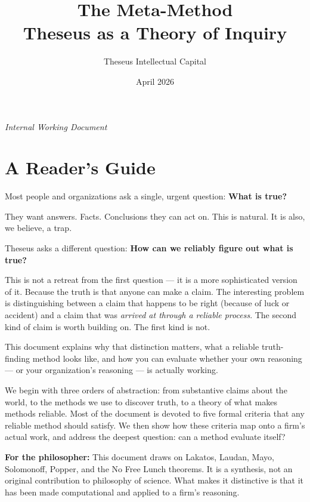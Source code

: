 \documentclass[11pt,letterpaper]{article}
\title{\Huge\textcolor{deepblue}{The Meta-Method}\\\vspace{0.5em}\large\textcolor{accent}{Theseus as a Theory of Inquiry}}
\author{\textcolor{midgray}{Theseus Intellectual Capital}}
\date{\textcolor{midgray}{April 2026}}
\begin{document}
\maketitle

\begin{center}
\textit{\textcolor{midgray}{Internal Working Document}}
\end{center}

\vspace{2em}


\section*{A Reader's Guide}

\noindent Most people and organizations ask a single, urgent question: \textbf{What is true?}

They want answers. Facts. Conclusions they can act on. This is natural. It is also, we believe, a trap.

Theseus asks a different question: \textbf{How can we reliably figure out what is true?}

This is not a retreat from the first question — it is a more sophisticated version of it. Because the truth is that anyone can make a claim. The interesting problem is distinguishing between a claim that happens to be right (because of luck or accident) and a claim that was \emph{arrived at through a reliable process}. The second kind of claim is worth building on. The first kind is not.

This document explains why that distinction matters, what a reliable truth-finding method looks like, and how you can evaluate whether your own reasoning — or your organization's reasoning — is actually working.

We begin with three orders of abstraction: from substantive claims about the world, to the methods we use to discover truth, to a theory of what makes methods reliable. Most of the document is devoted to five formal criteria that any reliable method should satisfy. We then show how these criteria map onto a firm's actual work, and address the deepest question: can a method evaluate itself?

\textbf{For the philosopher:} This document draws on Lakatos, Laudan, Mayo, Solomonoff, Popper, and the No Free Lunch theorems. It is a synthesis, not an original contribution to philosophy of science. What makes it distinctive is that it has been made computational and applied to a firm's reasoning.
\end{document}
